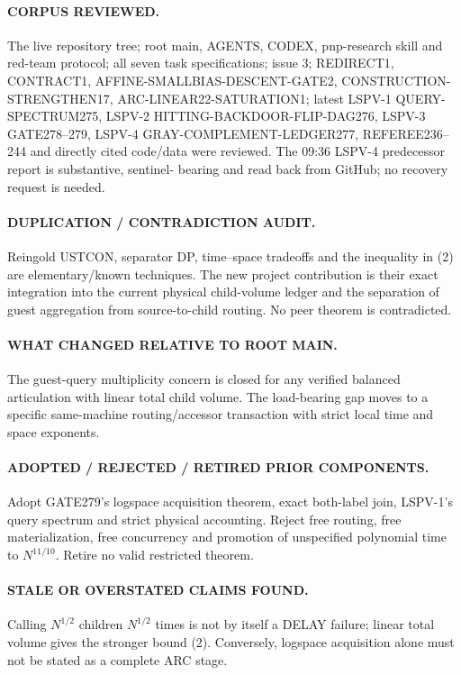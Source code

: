 \documentclass[11pt]{article}
\begin{document}
\paragraph{CORPUS REVIEWED.}
The live repository tree; root main, AGENTS, CODEX, pnp-research skill and
red-team protocol; all seven task specifications; issue 3; REDIRECT1,
CONTRACT1, AFFINE-SMALLBIAS-DESCENT-GATE2, CONSTRUCTION-STRENGTHEN17,
ARC-LINEAR22-SATURATION1; latest LSPV-1 QUERY-SPECTRUM275, LSPV-2
HITTING-BACKDOOR-FLIP-DAG276, LSPV-3 GATE278--279, LSPV-4
GRAY-COMPLEMENT-LEDGER277, REFEREE236--244 and directly cited code/data were
reviewed.  The 09:36 LSPV-4 predecessor report is substantive, sentinel-
bearing and read back from GitHub; no recovery request is needed.

\paragraph{DUPLICATION / CONTRADICTION AUDIT.}
Reingold USTCON, separator DP, time--space tradeoffs and the inequality in
(2) are elementary/known techniques.  The new project contribution is their
exact integration into the current physical child-volume ledger and the
separation of guest aggregation from source-to-child routing.  No peer theorem
is contradicted.

\paragraph{WHAT CHANGED RELATIVE TO ROOT MAIN.}
The guest-query multiplicity concern is closed for any verified balanced
articulation with linear total child volume.  The load-bearing gap moves to a
specific same-machine routing/accessor transaction with strict local time and
space exponents.

\paragraph{ADOPTED / REJECTED / RETIRED PRIOR COMPONENTS.}
Adopt GATE279's logspace acquisition theorem, exact both-label join, LSPV-1's
query spectrum and strict physical accounting.  Reject free routing, free
materialization, free concurrency and promotion of unspecified polynomial time
to $N^{11/10}$.  Retire no valid restricted theorem.

\paragraph{STALE OR OVERSTATED CLAIMS FOUND.}
Calling $N^{1/2}$ children $N^{1/2}$ times is not by itself a DELAY failure;
linear total volume gives the stronger bound (2).  Conversely, logspace
acquisition alone must not be stated as a complete ARC stage.
\end{document}
